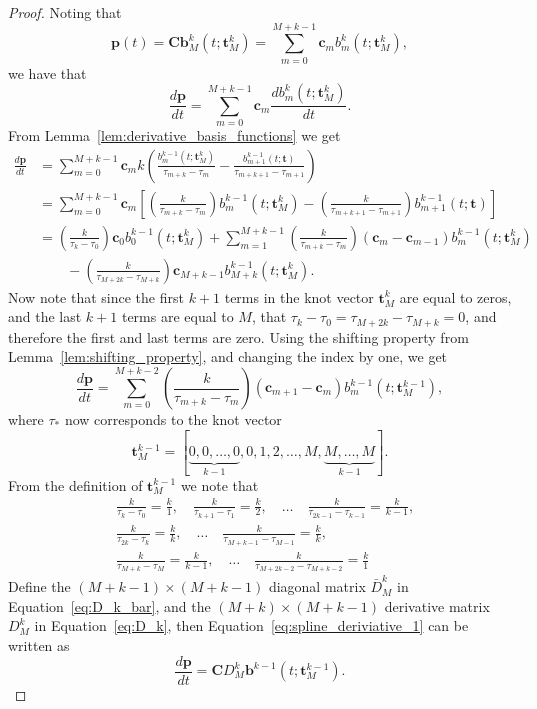 \documentclass{article}
\newcommand{\bbf}{\mathbf{b}}
\newcommand{\cbf}{\mathbf{c}}
\newcommand{\Cbf}{\mathbf{C}}
\begin{document}
\begin{proof}
Noting that
\[
\mathbf{p}(t) = \Cbf \bbf_M^k(t; \mathbf{t}_M^k)
              = \sum_{m=0}^{M+k-1} \cbf_m b_m^k(t; \mathbf{t}_M^k),
\]
we have that
\[
\frac{d\mathbf{p}}{dt} = \sum_{m=0}^{M+k-1} \cbf_m \frac{d b_m^k(t; \mathbf{t}_M^k)}{dt}.
\]
From Lemma~\ref{lem:derivative_basis_functions} we get
\begin{align*}
\frac{d\mathbf{p}}{dt} &= \sum_{m=0}^{M+k-1} \cbf_m k\left(\frac{b_m^{k-1}(t; \mathbf{t}_M^k)}{\tau_{m+k}-\tau_m} - \frac{b_{m+1}^{k-1}(t; \mathbf{t})}{\tau_{m+k+1}-\tau_{m+1}} \right) \\
&= \sum_{m=0}^{M+k-1} \cbf_m \left[ \left(\frac{k}{\tau_{m+k}-\tau_m}\right) b_m^{k-1}(t; \mathbf{t}_M^k) - \left(\frac{k}{\tau_{m+k+1}-\tau_{m+1}}\right)  b_{m+1}^{k-1}(t; \mathbf{t}) \right] \\
&= \left(\frac{k}{\tau_{k}-\tau_0}\right)\cbf_0 b_0^{k-1}(t; \mathbf{t}_M^k) + \sum_{m=1}^{M+k-1} \left(\frac{k}{\tau_{m+k}-\tau_m}\right) \left(  \cbf_m - \cbf_{m-1}  \right) b_m^{k-1}(t; \mathbf{t}_M^k) \\
&\qquad - \left(\frac{k}{\tau_{M+2k}-\tau_{M+k}}\right)\cbf_{M+k-1}b_{M+k}^{k-1}(t; \mathbf{t}_M^k).
\end{align*}
Now note that since the first $k+1$ terms in the knot vector $\mathbf{t}_M^k$ are equal to zeros, and the last $k+1$ terms are equal to $M$, that $\tau_k-\tau_0 = \tau_{M+2k}-\tau_{M+k} = 0$, and therefore the first and last terms are zero.  Using the shifting property from Lemma~\ref{lem:shifting_property}, and changing the index by one, we get
\begin{equation}\label{eq:spline_deriviative_1}
\frac{d\mathbf{p}}{dt} = \sum_{m=0}^{M+k-2} \left(\frac{k}{\tau_{m+k}-\tau_{m}}\right) \left( \cbf_{m+1} - \cbf_{m}  \right) b_{m}^{k-1}(t; \mathbf{t}_M^{k-1}),
\end{equation}
where $\tau_\ast$ now corresponds to the knot vector 
\[
\mathbf{t}_M^{k-1} = [\underbrace{0, 0, \dots, 0}_{k-1}, 0, 1, 2, \dots, M, \underbrace{M, \dots, M}_{k-1}].
\]
From the definition of $\mathbf{t}_M^{k-1}$ we note that
\begin{align*}
& \frac{k}{\tau_{k}-\tau_0} = \frac{k}{1}, \quad
\frac{k}{\tau_{k+1}-\tau_1} = \frac{k}{2}, \quad
\dots \quad
\frac{k}{\tau_{2k-1}-\tau_{k-1}} = \frac{k}{k-1},  \\
&\frac{k}{\tau_{2k}-\tau_{k}} = \frac{k}{k}, \quad
\dots \quad
\frac{k}{\tau_{M+k-1} - \tau_{M-1}} = \frac{k}{k}, \\
& \frac{k}{\tau_{M+k} - \tau_{M}} = \frac{k}{k-1}, \quad
\dots \quad
\frac{k}{\tau_{M+2k-2} - \tau_{M+k-2}} = \frac{k}{1}
\end{align*}
Define the $(M+k-1)\times(M+k-1)$ diagonal matrix $\bar{D}_M^k$ in Equation~\eqref{eq:D_k_bar}, and the $(M+k)\times (M+k-1)$ derivative matrix $D_M^k$ in Equation~\eqref{eq:D_k},
then Equation~\eqref{eq:spline_deriviative_1} can be written as
\[
\frac{d\mathbf{p}}{dt} = \Cbf D_M^k \bbf^{k-1}(t; \mathbf{t}_M^{k-1}).
\]
\end{proof}
\end{document}

